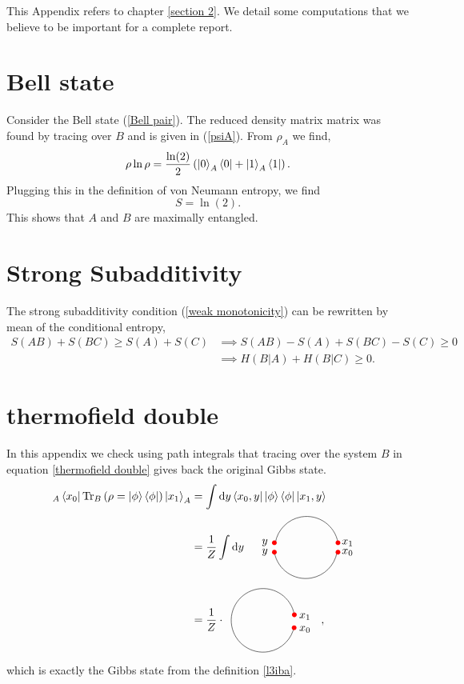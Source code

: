 This Appendix refers to chapter \ref{section 2}. We detail some computations that we believe to be important for a complete report.

\section{Bell state}

Consider the Bell state (\ref{Bell pair}). The reduced density matrix matrix was found by tracing over $B$ and is given in (\ref{psiA}). From $\rho_A$ we find,
\begin{equation}
    \rho\ln\rho= \frac{\ln(2)}{2}\left(\ket{0}_A\bra{0}+\ket{1}_A\bra{1}\right).
\end{equation}
Plugging this in the definition of von Neumann entropy, we find
\begin{equation}
    S = \ln(2).
\end{equation}
This shows that $A$ and $B$ are maximally entangled.

\section{Strong Subadditivity}
The strong subadditivity condition (\ref{weak monotonicity}) can be rewritten by mean of the conditional entropy,
\begin{align}
    S\left(AB\right) + S\left(BC\right) \geq S\left(A\right) + S\left(C\right) &\implies S\left(AB\right) -  S\left(A\right)  + S\left(BC\right)-S\left(C\right)\geq 0\\
    &\implies H\left(B|A\right) + H\left(B|C\right)\geq 0.
\end{align}

\section{thermofield double}

In this appendix we check using path integrals that tracing over the system $B$ in equation \ref{thermofield double} gives back the original Gibbs state. 
\begin{align}
    _A\bra{x_0}\text{Tr}_B\left(\rho=\ket{\phi}\bra{\phi}\right)\ket{x_1}_A &= \int\text{d}y\bra{x_0,y}\ket{\phi}\bra{\phi}\ket{x_1,y}\\
    &= \frac{1}{Z}\int\text{d}y ~~ \ctikz{\draw (-1,-0.15) arc (190:350:1);\node at (-1,-0.15) [circle,fill=red,inner sep=1.5pt]{}; \node at (1,-0.15) [circle,fill=red,inner sep=1.5pt]{};
    \draw node at (-1.3,-0.15){$y$};\draw node at (1.3,-0.15){$x_0$};\draw node at (-1.3,0.15){$y$};\draw node at (1.3,0.15){$x_1$}; \draw (1,0.15) arc (10:170:1);\node at (-1,0.15) [circle,fill=red,inner sep=1.5pt]{}; \node at (1,0.15) [circle,fill=red,inner sep=1.5pt]{};}\\
    &= \frac{1}{Z} \cdot \ctikz{\draw (0.967,0.255) arc (10:350:1);\node at (0.967,0.255) [circle,fill=red,inner sep=1.5pt]{}; \node at (0.96,-0.150) [circle,fill=red,inner sep=1.5pt]{};
    \draw node at (1.3,-0.2){$x_0$};\draw node at (1.3,0.2){$x_1$};},
\end{align}
which is exactly the Gibbs state from the definition \ref{l3iba}.